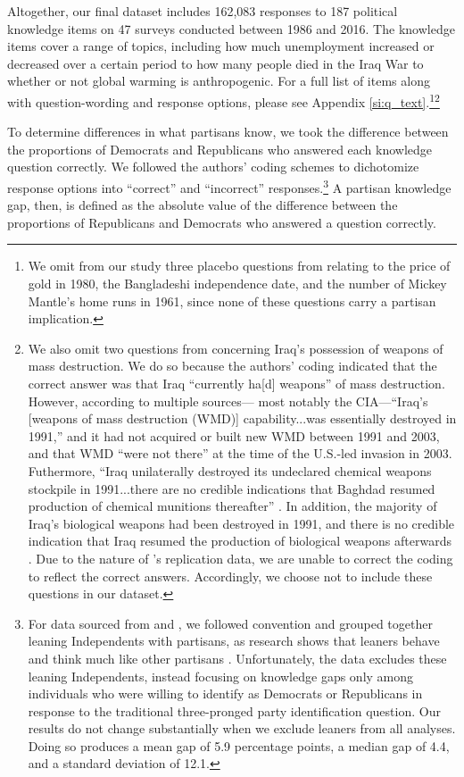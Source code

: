 \documentclass[12pt, letterpaper]{article}
\begin{document}
Altogether, our final dataset includes 162,083 responses to 187 political knowledge items on 47 surveys conducted between 1986 and 2016. The knowledge items cover a range of topics, including how much unemployment increased or decreased over a certain period to how many people died in the Iraq War to whether or not global warming is anthropogenic. For a full list of items along with question-wording and response options, please see Appendix \ref{si:q_text}.\footnote{We omit from our study three placebo questions from \citet{bullocketal_2015} relating to the price of gold in 1980, the Bangladeshi independence date, and the number of Mickey Mantle's home runs in 1961, since none of these questions carry a partisan implication.}\footnote{We also omit two questions from \citet{jerit2012partisan} concerning Iraq's possession of weapons of mass destruction. We do so because the authors' coding indicated that the correct answer was that Iraq ``currently ha[d] weapons'' of mass destruction. However, according to multiple sources--- most notably the CIA---``Iraq's [weapons of mass destruction (WMD)] capability...was essentially destroyed in 1991,'' and it had not acquired or built new WMD between 1991 and 2003, and that WMD ``were not there'' at the time of the U.S.-led invasion in 2003. Futhermore, ``Iraq unilaterally destroyed its undeclared chemical weapons stockpile in 1991...there are no credible indications that Baghdad resumed production of chemical munitions thereafter'' \citep{cia_2004}. In addition, the majority of Iraq's biological weapons had been destroyed in 1991, and there is no credible indication that Iraq resumed the production of biological weapons afterwards \citep{cia_2004}. Due to the nature of \citet{jerit2012partisan}'s replication data, we are unable to correct the coding to reflect the correct answers. Accordingly, we choose not to include these questions in our dataset.}

To determine differences in what partisans know, we took the difference between the proportions of Democrats and Republicans who answered each knowledge question correctly. We followed the authors' coding schemes to dichotomize response options into ``correct'' and ``incorrect'' responses.\footnote{For data sourced from \citet{bullocketal_2015} and \citet{prior2015you}, we followed convention and grouped together leaning Independents with partisans, as research shows that leaners behave and think much like other partisans \citep{keithetal_1992}. Unfortunately, the \citet{jerit2012partisan} data excludes these leaning Independents, instead focusing on knowledge gaps only among individuals who were willing to identify as Democrats or Republicans in response to the traditional three-pronged party identification question. Our results do not change substantially when we exclude leaners from all analyses. Doing so produces a mean gap of 5.9 percentage points, a median gap of 4.4, and a standard deviation of 12.1.} A partisan knowledge gap, then, is defined as the absolute value of the difference between the proportions of Republicans and Democrats who answered a question correctly. 
\end{document}
